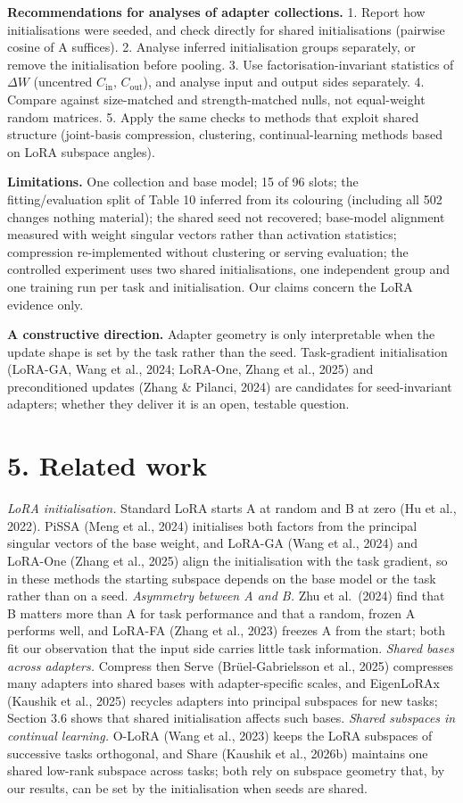 \documentclass[
  11pt,
]{article}
\begin{document}
\textbf{Recommendations for analyses of adapter collections.} 1. Report
how initialisations were seeded, and check directly for shared
initialisations (pairwise cosine of A suffices). 2. Analyse inferred
initialisation groups separately, or remove the initialisation before
pooling. 3. Use factorisation-invariant statistics of \(\Delta W\)
(uncentred \(C_{\text{in}}\), \(C_{\text{out}}\)), and analyse input and
output sides separately. 4. Compare against size-matched and
strength-matched nulls, not equal-weight random matrices. 5. Apply the
same checks to methods that exploit shared structure (joint-basis
compression, clustering, continual-learning methods based on LoRA
subspace angles).

\textbf{Limitations.} One collection and base model; 15 of 96 slots; the
fitting/evaluation split of Table 10 inferred from its colouring
(including all 502 changes nothing material); the shared seed not
recovered; base-model alignment measured with weight singular vectors
rather than activation statistics; compression re-implemented without
clustering or serving evaluation; the controlled experiment uses two
shared initialisations, one independent group and one training run per
task and initialisation. Our claims concern the LoRA evidence only.

\textbf{A constructive direction.} Adapter geometry is only
interpretable when the update shape is set by the task rather than the
seed. Task-gradient initialisation (LoRA-GA, Wang et al., 2024;
LoRA-One, Zhang et al., 2025) and preconditioned updates (Zhang \&
Pilanci, 2024) are candidates for seed-invariant adapters; whether they
deliver it is an open, testable question.

\section{5. Related work}\label{related-work}

\emph{LoRA initialisation.} Standard LoRA starts A at random and B at
zero (Hu et al., 2022). PiSSA (Meng et al., 2024) initialises both
factors from the principal singular vectors of the base weight, and
LoRA-GA (Wang et al., 2024) and LoRA-One (Zhang et al., 2025) align the
initialisation with the task gradient, so in these methods the starting
subspace depends on the base model or the task rather than on a seed.
\emph{Asymmetry between A and B.} Zhu et al.~(2024) find that B matters
more than A for task performance and that a random, frozen A performs
well, and LoRA-FA (Zhang et al., 2023) freezes A from the start; both
fit our observation that the input side carries little task information.
\emph{Shared bases across adapters.} Compress then Serve
(Br\"{u}el-Gabrielsson et al., 2025) compresses many adapters into shared
bases with adapter-specific scales, and EigenLoRAx (Kaushik et al.,
2025) recycles adapters into principal subspaces for new tasks; Section
3.6 shows that shared initialisation affects such bases. \emph{Shared
subspaces in continual learning.} O-LoRA (Wang et al., 2023) keeps the
LoRA subspaces of successive tasks orthogonal, and Share (Kaushik et
al., 2026b) maintains one shared low-rank subspace across tasks; both
rely on subspace geometry that, by our results, can be set by the
initialisation when seeds are shared.
\end{document}
